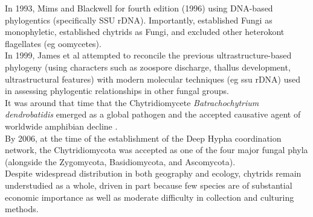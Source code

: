 \indent In 1993, Mims and Blackwell for fourth edition (1996) using DNA-based phylogentics (specifically SSU rDNA). Importantly, established Fungi as monophyletic, established chytrids as Fungi, and excluded other heterokont flagellates (eg oomycetes).\\
\indent In 1999, James et al attempted to reconcile the previous ultrastructure-based phylogeny (using characters such as zoospore discharge, thallus development, ultrastructural features) with modern molecular techniques (eg ssu rDNA) used in assessing phylogentic relationships in other fungal groups.\\
\indent It was around that time that the Chytridiomycete \textit{Batrachochytrium dendrobatidis} emerged as a global pathogen and the accepted causative agent of worldwide amphibian decline \cite{Berger1998}.\\
\indent By 2006, at the time of the establishment of the Deep Hypha coordination network, the Chytridiomycota was accepted as one of the four major fungal phyla (alongside the Zygomycota, Basidiomycota, and Ascomycota).\\
\indent Despite widespread distribution in both geography and ecology, chytrids remain understudied as a whole, driven in part because few species are of substantial economic importance \cite{Powell1993,James2000} as well as moderate difficulty in collection and culturing methods. \\
